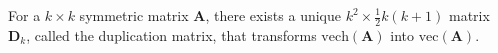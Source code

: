 \noindent For a
$
k \times k
$
symmetric matrix
$
\mathbf{A}
$,
there exists a unique
$
k^2 \times \frac{1}{2} k \left( k + 1 \right)
$
matrix
$
\mathbf{D}_{k}
$,
called the duplication matrix,
that transforms
$
\mathrm{vech}
\left(
\mathbf{A}
\right)
$
into
$
\mathrm{vec}
\left(
\mathbf{A}
\right)
$.
